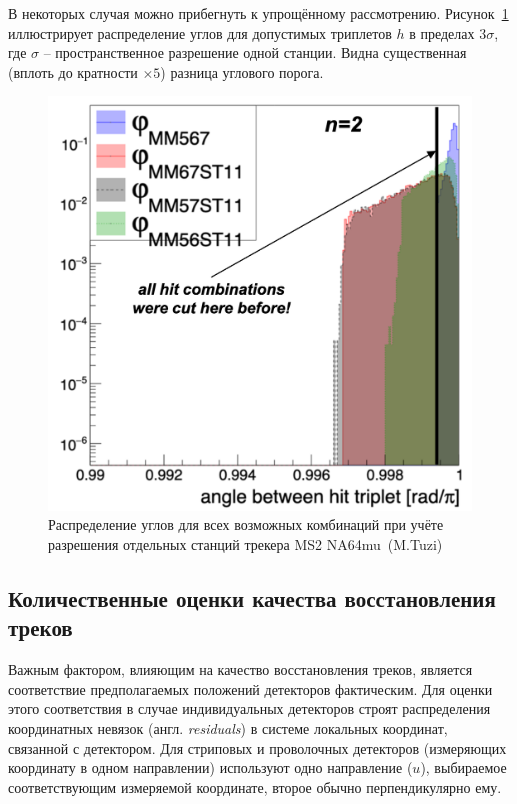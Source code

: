 В некоторых случая можно прибегнуть к упрощённому рассмотрению.
Рисунок~\ref{fig:na64-cutoff-angle} иллюстрирует распределение углов
для допустимых триплетов $h$ в пределах $3\sigma$, где $\sigma$ -- пространственное
разрешение одной станции. Видна существенная (вплоть до кратности $\times5$) разница
углового порога.
\begin{figure}[ht]
    \centering
    \includegraphics[width=0.5\linewidth]{images//illustrative/na64-cutoff-effic.png}
    \caption{Распределение углов для всех возможных комбинаций при учёте разрешения
    отдельных станций трекера MS2 NA64mu~(M.Tuzi)}
    \label{fig:na64-cutoff-angle}
\end{figure}

\subsection{Количественные оценки качества восстановления треков}



Важным фактором, влияющим на качество восстановления треков, является
соответствие предполагаемых положений детекторов фактическим. Для
оценки этого соответствия в случае индивидуальных детекторов строят
распределения координатных невязок (англ. \emph{residuals}) в
системе локальных координат, связанной с детектором.
Для стриповых и проволочных детекторов (измеряющих координату в
одном направлении) используют одно направление ($u$), выбираемое
соответствующим измеряемой координате, второе обычно
перпендикулярно ему.


